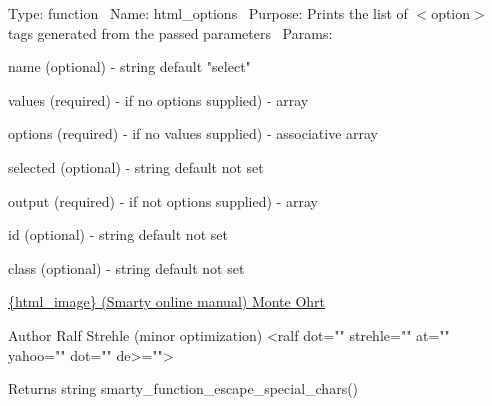 Type\+: function~\newline
 Name\+: html\+\_\+options~\newline
 Purpose\+: Prints the list of $<$option$>$ tags generated from the passed parameters~\newline
 Params\+: 
\begin{DoxyPre}
\begin{DoxyItemize}
\item name       (optional) - string default "select"
\item values     (required) - if no options supplied) - array
\item options    (required) - if no values supplied) - associative array
\item selected   (optional) - string default not set
\item output     (required) - if not options supplied) - array
\item id         (optional) - string default not set
\item class      (optional) - string default not set

\end{DoxyItemize}\end{DoxyPre}



\begin{DoxyPre}\hyperlink{}{\{html\_image\}
     (Smarty online manual)
 Monte Ohrt } 
\begin{DoxyAuthor}{Author}
Ralf Strehle (minor optimization) <ralf dot="" strehle="" at="" yahoo="" dot="" de>="">

\end{DoxyAuthor}

\begin{DoxyReturn}{Returns}
string 
 smarty\_function\_escape\_special\_chars()

\end{DoxyReturn}
\end{DoxyPre}
\hypertarget{function_8html__options_8php_aef999ceaf35366110925adfde591603e}{}
